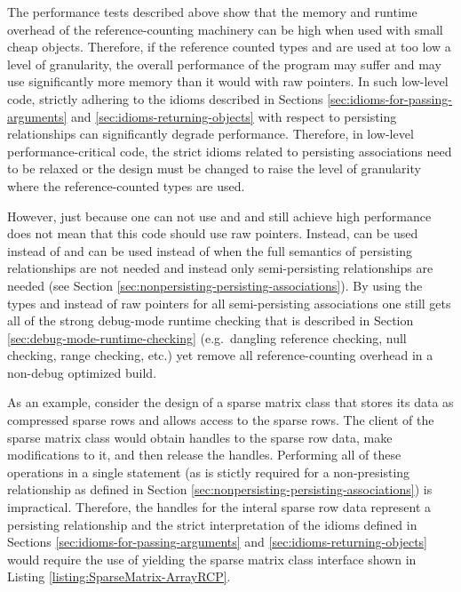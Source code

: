 \documentclass[pdf,ps2pdf,11pt]{SANDreport}
\begin{document}
The performance tests described above show that the memory and runtime
overhead of the reference-counting machinery can be high when used
with small cheap objects.  Therefore, if the reference counted types
{} and {} are used at too low a level of
granularity, the overall performance of the program may suffer and may
use significantly more memory than it would with raw pointers.  In
such low-level code, strictly adhering to the idioms described in
Sections {}\ref{sec:idioms-for-passing-arguments} and
{}\ref{sec:idioms-returning-objects} with respect to persisting
relationships can significantly degrade performance.  Therefore, in
low-level performance-critical code, the strict idioms related to
persisting associations need to be relaxed or the design must be
changed to raise the level of granularity where the reference-counted
types are used.

However, just because one can not use {} and {}
and still achieve high performance does not mean that this code should
use raw pointers.  Instead, {} can be used instead of
{} and {} can be used instead of
{} when the full semantics of persisting relationships
are not needed and instead only semi-persisting relationships are
needed (see Section
{}\ref{sec:nonpersisting-persisting-associations}).  By using the
types {} and {} instead of raw pointers for
all semi-persisting associations one still gets all of the strong
debug-mode runtime checking that is described in Section
{}\ref{sec:debug-mode-runtime-checking} (e.g.\ dangling reference
checking, null checking, range checking, etc.) yet remove all
reference-counting overhead in a non-debug optimized build.

As an example, consider the design of a sparse matrix class that
stores its data as compressed sparse rows and allows access to the
sparse rows.  The client of the sparse matrix class would obtain
handles to the sparse row data, make modifications to it, and then
release the handles.  Performing all of these operations in a single
statement (as is stictly required for a non-presisting relationship as
defined in Section {}\ref{sec:nonpersisting-persisting-associations})
is impractical.  Therefore, the handles for the interal sparse row
data represent a persisting relationship and the strict interpretation
of the idioms defined in Sections
{}\ref{sec:idioms-for-passing-arguments} and
{}\ref{sec:idioms-returning-objects} would require the use of
{} yielding the sparse matrix class interface shown
in Listing {}\ref{listing:SparseMatrix-ArrayRCP}.
\end{document}
